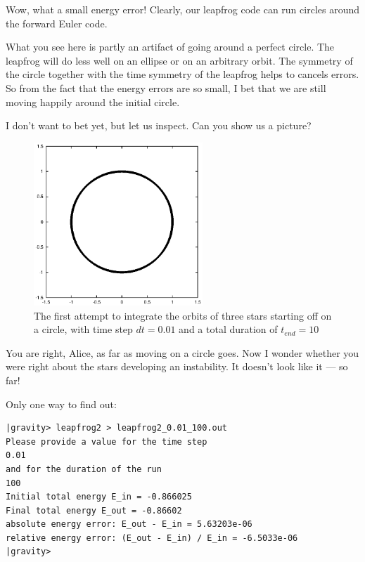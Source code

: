 \abc

\bob
Wow, what a small energy error!  Clearly, our leapfrog code can run
circles around the forward Euler code.

\alice
What you see here is partly an artifact of going around a perfect
circle.  The leapfrog will do less well on an ellipse or on an
arbitrary orbit.  The symmetry of the circle together with the time
symmetry of the leapfrog helps to cancels errors.  So from the fact
that the energy errors are so small, I bet that we are still moving
happily around the initial circle.

\carol
I don't want to bet yet, but let us inspect.  Can you show us a
picture?

\cba

\begin{figure}[htb]
\centering
\includegraphics[width=2.5in]{chap5/leapfrog2_0.01_10.ps}
\caption[Three stars on a circle, leapfrog, $dt = 0.01$, $t_{end} = 10$]
{The first attempt to integrate the orbits of three stars
starting off on a circle, with time step $dt = 0.01$ and a total
duration of $t_{end} = 10$}
\label{fig:leap2-0.01-10}
\end{figure}

\abc

\bob
You are right, Alice, as far as moving on a circle goes.  Now I wonder
whether you were right about the stars developing an instability.  It
doesn't look like it --- so far!

\alice
Only one way to find out:

\cba

\begin{small}
\begin{verbatim}
|gravity> leapfrog2 > leapfrog2_0.01_100.out
Please provide a value for the time step
0.01
and for the duration of the run
100
Initial total energy E_in = -0.866025
Final total energy E_out = -0.86602
absolute energy error: E_out - E_in = 5.63203e-06
relative energy error: (E_out - E_in) / E_in = -6.5033e-06
|gravity>
\end{verbatim}
\end{small}

